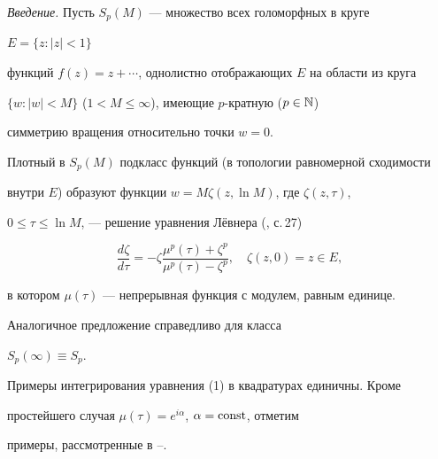  




 


\maketitle 


\label{begin} 


 


{\it Введение.} Пусть $S_p(M)$ --- множество всех голоморфных в круге 


$E=\{z:|z|<1\}$ 


функций $f(z)=z+\dotsb$, однолистно отображающих $E$ на области из круга 


$\{w:|w|<M\}$ ($1<M\le\infty$), имеющие $p$-кратную ($p\in\Bbb N$)


симметрию вращения относительно точки $w=0$. 


 


Плотный в $S_p(M)$ подкласс функций (в топологии равномерной сходимости 


внутри $E$) образуют функции $w=M\zeta(z,\ln M)$, где $\zeta(z,\tau)$, 


$0\le\tau\le\ln M$, --- решение уравнения Л\"евнера (\cite{1}, с.\,27) 


\begin{equation} 


\frac{d\zeta}{d\tau}= 


-\zeta\frac{\mu^p(\tau)+\zeta^p}{\mu^p(\tau)-\zeta^p},\quad 


\zeta(z,0)=z\in E, 


\end{equation} 


в котором $\mu(\tau)$ --- непрерывная функция с модулем, равным единице. 


Аналогичное предложение справедливо для класса 


$S_p(\infty)\equiv S_p$. 


 


Примеры интегрирования уравнения (1) в квадратурах единичны. Кроме 


простейшего случая $\mu(\tau)=e^{i\alpha}$, $\alpha=\operatorname{const}$, отметим 


примеры, рассмотренные в \cite{2}--\cite{4}. 


